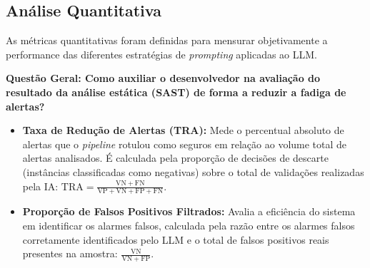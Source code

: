 \begin{figure}[htpb]
{
    }
    \fonteautores
\end{figure}

\subsection{Análise Quantitativa}
As métricas quantitativas foram definidas para mensurar objetivamente a performance das diferentes estratégias de \textit{prompting} aplicadas ao LLM.

\textbf{Questão Geral: Como auxiliar o desenvolvedor na avaliação do resultado da análise estática (SAST) de forma a reduzir a fadiga de alertas?}
\begin{itemize}
\item \textbf{Taxa de Redução de Alertas (TRA):} Mede o percentual absoluto de alertas que o \textit{pipeline} rotulou como seguros em relação ao volume total de alertas analisados. É calculada pela proporção de decisões de descarte (instâncias classificadas como negativas) sobre o total de validações realizadas pela IA: $\mathrm{TRA} = \frac{\mathrm{VN} + \mathrm{FN}}{\mathrm{VP} + \mathrm{VN} + \mathrm{FP} + \mathrm{FN}}$.
\item \textbf{Proporção de Falsos Positivos Filtrados:} Avalia a eficiência do sistema em identificar os alarmes falsos, calculada pela razão entre os alarmes falsos corretamente identificados pelo LLM e o total de falsos positivos reais presentes na amostra: $\frac{\mathrm{VN}}{\mathrm{VN} + \mathrm{FP}}$.
\end{itemize}

